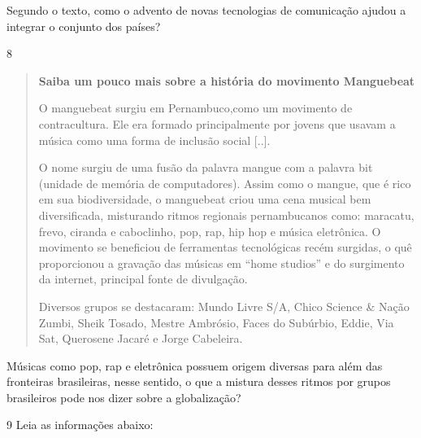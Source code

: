 Segundo o texto, como o advento de novas tecnologias de comunicação
ajudou a integrar o conjunto dos países?

\linhas[5]


\num{8}

\begin{quote}
\textbf{Saiba um pouco mais sobre a história do movimento Manguebeat}

O manguebeat surgiu em Pernambuco,como um movimento de
contracultura. Ele era formado principalmente por jovens que usavam a
música como uma forma de inclusão social {[}..{]}.

O nome surgiu de uma fusão da palavra mangue com a palavra bit
(unidade de memória de computadores). Assim como o mangue, que é rico em
sua biodiversidade, o manguebeat criou uma cena musical bem
diversificada, misturando ritmos regionais pernambucanos como: maracatu,
frevo, ciranda e caboclinho, pop, rap, hip hop e música eletrônica. O
movimento se beneficiou de ferramentas tecnológicas recém surgidas, o
quê proporcionou a gravação das músicas em ``home studios'' e do
surgimento da internet, principal fonte de divulgação.

Diversos grupos se destacaram: Mundo Livre S/A, Chico Science \&
Nação Zumbi, Sheik Tosado, Mestre Ambrósio, Faces do Subúrbio, Eddie,
Via Sat, Querosene Jacaré e Jorge Cabeleira.

\end{quote}

Músicas como pop, rap e eletrônica possuem origem diversas para além das
fronteiras brasileiras, nesse sentido, o que a mistura desses ritmos por
grupos brasileiros pode nos dizer sobre a globalização?

\linhas[5]


\num{9} Leia as informações abaixo:

